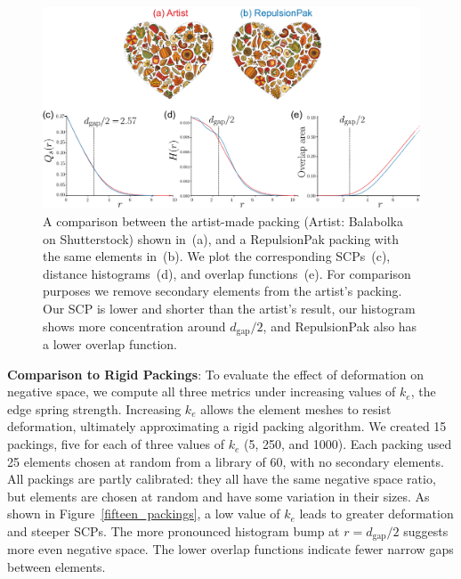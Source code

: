 \begin{figure}[t]
\centering
\includegraphics[width=1.0\textwidth]{figures/metrics/balabolka_comparison.pdf}
\caption[A comparison between the artist-made packing \newline  and a RepulsionPak packing]
{ \label{balabolka_comparison} 
    A comparison between the artist-made packing (Artist: Balabolka on Shutterstock) shown in~(a), and a RepulsionPak packing
  with the same elements in~(b).  We plot the corresponding SCPs~(c),
  distance histograms~(d), and overlap functions~(e).
    For comparison purposes we remove secondary elements from the artist's
  packing.  Our SCP is lower and shorter than the artist's result,
    our histogram shows more concentration around $d_\mathrm{gap} / 2$,
    and RepulsionPak also has a lower overlap function.
}
\end{figure}

\textbf{Comparison to Rigid Packings}: 
To evaluate the effect of deformation on negative space, we compute all three metrics under
increasing values of $k_e$, the edge spring strength.  Increasing $k_e$
allows the element meshes to resist deformation, ultimately
approximating a rigid packing algorithm.  We created 15 packings,
five for each of three values of $k_e$ (5, 250, and 1000).  Each packing
used 25 elements chosen at random from a library of 60, with
no secondary elements.  
All packings are partly calibrated: they all have the same negative
space ratio, but elements are chosen at random and have some
variation in their sizes.
As shown in Figure~\ref{fifteen_packings}, a low value of
$k_e$ leads to greater deformation and steeper SCPs.
The more pronounced histogram bump at $r=d_\mathrm{gap}/2$ suggests
more even negative space.
The lower overlap functions indicate fewer narrow gaps between elements.

